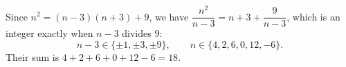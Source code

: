 Since $n^2=(n-3)(n+3)+9$, we have $\dfrac{n^2}{n-3}=n+3+\dfrac{9}{n-3}$, which is an integer exactly when $n-3$ divides $9$:
\[n-3\in\{\pm1,\pm3,\pm9\},\qquad n\in\{4,2,6,0,12,-6\}.\]
Their sum is $4+2+6+0+12-6=\boxed{18}$.

